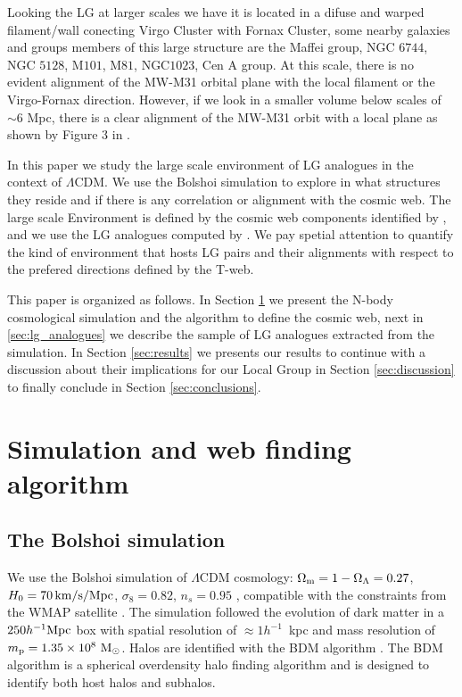 \documentclass{emulateapj}
\newcommand{\manuscript}{paper }
\newcommand{\mpc}{\rm{Mpc}}
\newcommand{\hmpc}{{\ifmmode{h^{-1}{\rm Mpc}}\else{$h^{-1}$Mpc }\fi}}
\begin{document}
Looking the LG at larger scales we have it is located in a difuse and
warped filament/wall conecting Virgo Cluster with Fornax Cluster, some
nearby galaxies and groups members of this large structure are the
Maffei group, NGC $6744$, NGC $5128$, M$101$, M$81$, NGC$1023$, Cen A
group. At this scale, there is no evident alignment of the MW-M31
orbital plane with the local filament or the Virgo-Fornax
direction. However, if we look in a smaller volume below scales of
$\sim 6$ \mpc, there is a clear alignment of the MW-M31 orbit with
a local plane as shown by Figure $3$ in \citet{2013AJ....146...69C}.  


In this \manuscript we study the large scale environment of LG 
analogues in the context of $\Lambda$CDM. We use the Bolshoi
simulation to explore in what structures they reside and if there is
any correlation or alignment with the cosmic web. The large scale
Environment is defined by the cosmic web components identified by
\citet{Tweb}, and we use the LG analogues computed by
\citet{lganalogues}. We pay spetial attention to quantify the kind of
environment that hosts LG pairs and their alignments with respect to
the prefered directions defined by the T-web. 
   
This \manuscript is organized as follows. In Section \ref{sec:simulation}
we present the N-body cosmological simulation and the algorithm to
define the cosmic web, next in \ref{sec:lg_analogues} we describe the
sample of LG analogues extracted from the simulation. In
Section \ref{sec:results} we presents our results to continue with a
discussion about their implications for our Local Group in Section
\ref{sec:discussion} to finally conclude in Section
\ref{sec:conclusions}. 


\section{Simulation and web finding algorithm}
\label{sec:simulation}

\subsection{The Bolshoi simulation}
We use the Bolshoi simulation of $\Lambda$CDM cosmology: $\Omega_{\rm
  m}=1-\Omega_{\Lambda}=0.27$, $H_0=70\,\rm km/s/Mpc$,
$\sigma_8=0.82$, $n_s=0.95$ \citep{2011ApJ...740..102K}, compatible
with the constraints from the WMAP satellite
\citep{hinshaw_etal13}. The simulation followed the evolution of dark
matter in a $250 \hmpc$ box with spatial resolution of $\approx
1h^{-1}$~kpc and mass resolution of $m_{\rm p}=1.35\times 10^8\ \rm
M_{\odot}$. Halos are identified with the BDM algorithm
\citep{1997astro.ph.12217K}. The BDM algorithm is  a spherical
overdensity halo finding algorithm and is designed to identify both
host halos and subhalos. 
\end{document}
